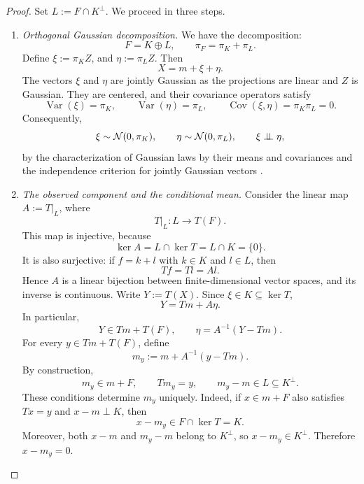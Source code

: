         \begin{proof}
        Set
        \(
            L:=F\cap K^\perp
        \).
        We proceed in three steps.
        
        \begin{enumerate}[wide]
            \item \emph{Orthogonal Gaussian decomposition.}
            We have the decomposition:
            \[
                F=K\oplus L,
                \qquad
                \pi_F=\pi_K+\pi_L.
            \]
            Define $\xi:=\pi_K Z$, and $\eta:=\pi_L Z$.
            Then
            \[
                X=m+\xi+\eta.
            \]
            The vectors $\xi$ and $\eta$ are jointly Gaussian as the projections are linear and $Z$ is Gaussian.
            They are centered, and their covariance operators satisfy
            \[
                \operatorname{Var}(\xi)=\pi_K,
                \qquad
                \operatorname{Var}(\eta)=\pi_L,
                \qquad
                \operatorname{Cov}(\xi,\eta)
                =\pi_K\pi_L=0.
            \]
            Consequently,
            \[
                \xi\sim\mathcal N(0,\pi_K),
                \qquad
                \eta\sim\mathcal N(0,\pi_L),
                \qquad
                \xi\perp \!\!\! \perp\eta,
            \]
            by the characterization of Gaussian laws by their means
            and covariances and the independence criterion for
            jointly Gaussian vectors
            \cite[Lemma~14.1]{kallenberg2021foundations}.
        
            \item \emph{The observed component and the conditional mean.}
            Consider the linear map $A :=T|_L$, where
            \[
                T|_L:L\longrightarrow T(F).
            \]
            This map is injective, because
            \[
                \ker A=L\cap\ker T=L\cap K=\{0\}.
            \]
            It is also surjective: if $f=k+l$ with $k\in K$
            and $l\in L$, then
            \[
                Tf=Tl=Al.
            \]
            Hence $A$ is a linear bijection between finite-dimensional
            vector spaces, and its inverse is continuous.
            Write $Y:=T(X)$. Since $\xi\in K\subseteq\ker T$,
            \[
                Y=Tm+A\eta.
            \]
            In particular,
            \[
                Y\in Tm+T(F),
                \qquad
                \eta=A^{-1}(Y-Tm).
            \]
            For every $y\in Tm+T(F)$, define
            \[
                m_y:=m+A^{-1}(y-Tm).
            \]
            By construction,
            \[
                m_y\in m+F,
                \qquad
                Tm_y=y,
                \qquad
                m_y-m\in L\subseteq K^\perp.
            \]
            These conditions determine $m_y$ uniquely.
            Indeed, if $x\in m+F$ also satisfies $Tx=y$ and
            $x-m\perp K$, then
            \[
                x-m_y\in F\cap\ker T=K.
            \]
            Moreover, both $x-m$ and $m_y-m$ belong to $K^\perp$,
            so $x-m_y\in K^\perp$. Therefore $x-m_y=0$.
        

\end{enumerate}
\end{proof}
